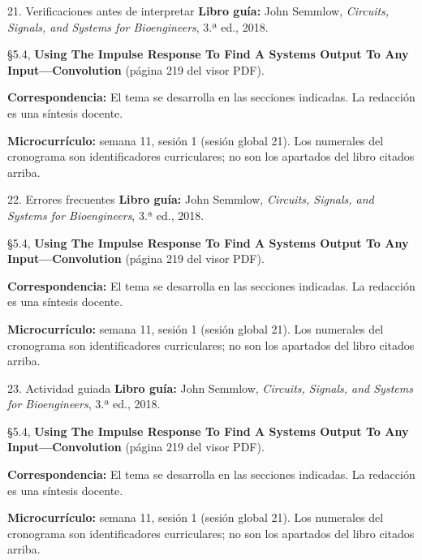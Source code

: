 \documentclass[
  10pt,
  ignorenonframetext,
  aspectratio=169,
  spanish,
]{beamer}
\begin{document}
\begin{frame}{21. Verificaciones antes de interpretar}
\label{verificaciones-antes-de-interpretar}
\textbf{Libro guía:} John Semmlow, \emph{Circuits, Signals, and Systems
for Bioengineers}, 3.ª ed., 2018.

§5.4, \textbf{Using The Impulse Response To Find A Systems Output To Any
Input---Convolution} (página 219 del visor PDF).

\textbf{Correspondencia:} El tema se desarrolla en las secciones
indicadas. La redacción es una síntesis docente.

\textbf{Microcurrículo:} semana 11, sesión 1 (sesión global 21). Los
numerales del cronograma son identificadores curriculares; no son los
apartados del libro citados arriba.
\end{frame}

\begin{frame}{22. Errores frecuentes}
\label{errores-frecuentes}
\textbf{Libro guía:} John Semmlow, \emph{Circuits, Signals, and Systems
for Bioengineers}, 3.ª ed., 2018.

§5.4, \textbf{Using The Impulse Response To Find A Systems Output To Any
Input---Convolution} (página 219 del visor PDF).

\textbf{Correspondencia:} El tema se desarrolla en las secciones
indicadas. La redacción es una síntesis docente.

\textbf{Microcurrículo:} semana 11, sesión 1 (sesión global 21). Los
numerales del cronograma son identificadores curriculares; no son los
apartados del libro citados arriba.
\end{frame}

\begin{frame}{23. Actividad guiada}
\label{actividad-guiada}
\textbf{Libro guía:} John Semmlow, \emph{Circuits, Signals, and Systems
for Bioengineers}, 3.ª ed., 2018.

§5.4, \textbf{Using The Impulse Response To Find A Systems Output To Any
Input---Convolution} (página 219 del visor PDF).

\textbf{Correspondencia:} El tema se desarrolla en las secciones
indicadas. La redacción es una síntesis docente.

\textbf{Microcurrículo:} semana 11, sesión 1 (sesión global 21). Los
numerales del cronograma son identificadores curriculares; no son los
apartados del libro citados arriba.
\end{frame}
\end{document}
